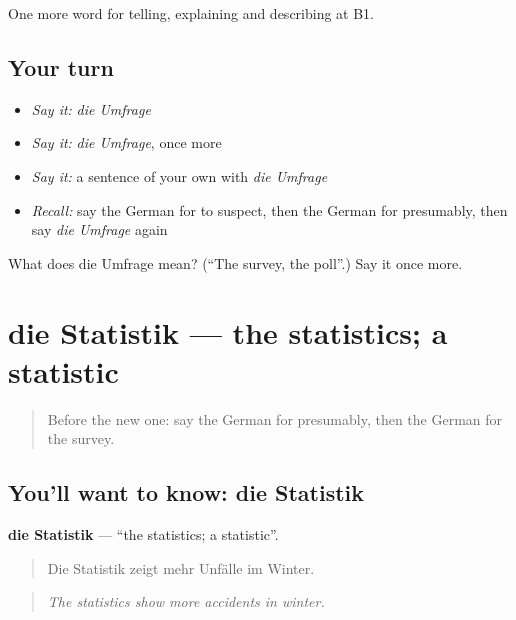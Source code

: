 \begin{grammarlens}[title={What you've built}]
One more word for telling, explaining and describing at B1.
\end{grammarlens}

\subsection*{Your turn}
\begin{itemize}
\raggedright
  \item \emph{Say it:} \emph{die Umfrage}
  \item \emph{Say it:} \emph{die Umfrage}, once more
  \item \emph{Say it:} a sentence of your own with \emph{die Umfrage}
  \item \emph{Recall:} say the German for to suspect, then the German for presumably, then say \emph{die Umfrage} again
\end{itemize}

\begin{tcolorbox}[breakable,colback=teal!4,colframe=teal!35!black,title={Before you move on}]
What does die Umfrage mean? (\textquotedblleft{}The survey, the poll\textquotedblright{}.) Say it once more.
\end{tcolorbox}
\section[die Statistik]{die Statistik — the statistics; a statistic}

\label{lesson:GE-C276-statistik}



\begin{quote}
Before the new one: say the German for presumably, then the German for the survey.
\end{quote}

\subsection*{You'll want to know: die Statistik}
\textbf{die Statistik} — \textquotedblleft{}the statistics; a statistic\textquotedblright{}.

\begin{quote}
Die Statistik zeigt mehr Unfälle im Winter.
\end{quote}

\begin{quote}
\emph{The statistics show more accidents in winter.}
\end{quote}


